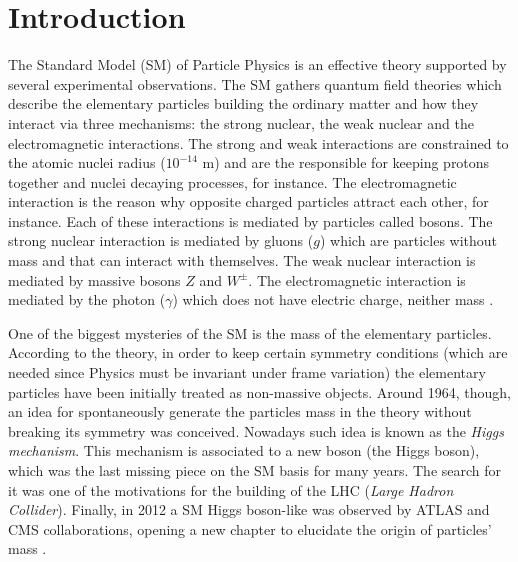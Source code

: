 \chapter{Introduction}
The Standard Model (SM) of Particle Physics is an effective theory supported by several experimental observations. The SM gathers quantum field theories which describe the elementary particles building the ordinary matter and how they interact via three mechanisms: the strong nuclear, the weak nuclear and the electromagnetic interactions. The strong and weak interactions are constrained to the atomic nuclei radius ($10^{-14}$ m) and are the responsible for keeping protons together and nuclei decaying processes, for instance. The electromagnetic interaction is the reason why opposite charged particles attract each other, for instance. Each of these interactions is mediated by particles called bosons. The strong nuclear interaction is mediated by gluons ($g$) which are particles without mass and that can interact with themselves. The weak nuclear interaction is mediated by massive bosons $Z$ and $W^{\pm}$. The electromagnetic interaction is mediated by the photon ($\gamma$) which does not have electric charge, neither mass \cite{bib:whitbeck-2013, bib:brachem-2012, bib:griffiths-2008, bib:halzen-martin-1984}.

One of the biggest mysteries of the SM is the mass of the elementary particles. According to the theory, in order to keep certain symmetry conditions (which are needed since Physics must be invariant under frame variation) the elementary particles have been initially treated as non-massive objects. Around 1964, though, an idea for spontaneously generate the particles mass in the theory without breaking its symmetry was conceived. Nowadays such idea is known as the \textit{Higgs mechanism}. This mechanism is associated to a new boson (the Higgs boson), which was the last missing piece on the SM basis for many years. The search for it was one of the motivations for the building of the LHC (\textit{Large Hadron Collider}). Finally, in 2012 a SM Higgs boson-like was observed by ATLAS and CMS collaborations, opening a new chapter to elucidate the origin of particles' mass \cite{bib:whitbeck-2013, bib:brachem-2012, bib:griffiths-2008, bib:halzen-martin-1984}.

